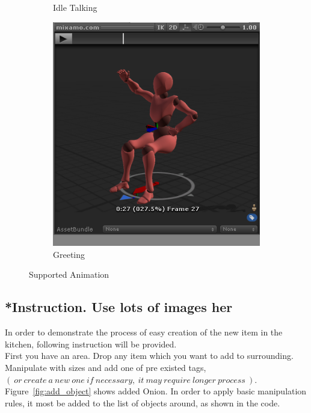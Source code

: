 \documentclass[18pt]{article}
\numberwithin{equation}{section} %
\numberwithin{figure}{section} %
\numberwithin{table}{section} %
\begin{document}
\begin{figure}[H]
\begin{subfigure}{0.2\textwidth}
			\caption{Idle Talking}
		\end{subfigure}
		\begin{subfigure}{0.2\textwidth}
			\centering
			\includegraphics[width=0.96\linewidth]{images/sit_wave}
			\caption{Greeting}
		\end{subfigure}				
		\caption{Supported Animation}
		\label{fig:animat}
	\end{figure}
	
	\subsection{*Instruction. Use lots of images her}
	
	In order to demonstrate the process of easy creation of the new item in the kitchen, following instruction will be provided.\\
	
	First you have an area. Drop any item which you want to add to surrounding. Manipulate with sizes and add one of pre existed tags, $\left(\ or\ create\ a\ new\ one\ if\ necessary,\ it\ may\ require\ longer\ process\  \right) . $ Figure~\ref{fig:add_object} shows added Onion. In order to apply basic manipulation rules, it most be added to the list of objects around, as shown in the code. \\
	
\end{document}
